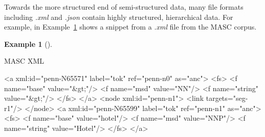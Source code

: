\documentclass[
  letterpaper,
  DIV=11,
  numbers=noendperiod]{scrreport}
\newenvironment{Shaded}{\begin{snugshade}}{\end{snugshade}}
\newcommand{\DecValTok}[1]{\textcolor[rgb]{0.00,0.00,0.00}{#1}}
\newcommand{\KeywordTok}[1]{\textcolor[rgb]{0.00,0.00,0.00}{#1}}
\newcommand{\NormalTok}[1]{\textcolor[rgb]{0.00,0.00,0.00}{#1}}
\newcommand{\OtherTok}[1]{\textcolor[rgb]{0.00,0.00,0.00}{#1}}
\newcommand{\StringTok}[1]{\textcolor[rgb]{0.00,0.00,0.00}{#1}}
\theoremstyle{definition}
\newtheorem{example}{Example}[chapter]
\theoremstyle{remark}
\begin{document}
Towards the more structured end of semi-structured data, many file
formats including \emph{.xml} and \emph{.json} contain highly
structured, hierarchical data. For example, in
Example~\ref{exm-masc-xml} shows a snippet from a \emph{.xml} file from
the MASC corpus.

\begin{example}[]\protect\hypertarget{exm-masc-xml}{}\label{exm-masc-xml}

MASC XML

\begin{Shaded}
\begin{Highlighting}[]
\NormalTok{\textless{}}\KeywordTok{a}\OtherTok{ xml:id=}\StringTok{"penn{-}N65571"}\OtherTok{ label=}\StringTok{"tok"}\OtherTok{ ref=}\StringTok{"penn{-}n0"}\OtherTok{ as=}\StringTok{"anc"}\NormalTok{\textgreater{}                                                                                                                                                        }
\NormalTok{  \textless{}}\KeywordTok{fs}\NormalTok{\textgreater{}}
\NormalTok{    \textless{}}\KeywordTok{f}\OtherTok{ name=}\StringTok{"base"}\OtherTok{ value=}\StringTok{"}\DecValTok{\&gt;}\StringTok{"}\NormalTok{/\textgreater{}}
\NormalTok{    \textless{}}\KeywordTok{f}\OtherTok{ name=}\StringTok{"msd"}\OtherTok{ value=}\StringTok{"NN"}\NormalTok{/\textgreater{}}
\NormalTok{    \textless{}}\KeywordTok{f}\OtherTok{ name=}\StringTok{"string"}\OtherTok{ value=}\StringTok{"}\DecValTok{\&gt;}\StringTok{"}\NormalTok{/\textgreater{}}
\NormalTok{  \textless{}/}\KeywordTok{fs}\NormalTok{\textgreater{}}
\NormalTok{\textless{}/}\KeywordTok{a}\NormalTok{\textgreater{}}
\NormalTok{\textless{}}\KeywordTok{node}\OtherTok{ xml:id=}\StringTok{"penn{-}n1"}\NormalTok{\textgreater{}}
\NormalTok{  \textless{}}\KeywordTok{link}\OtherTok{ targets=}\StringTok{"seg{-}r1"}\NormalTok{/\textgreater{}}
\NormalTok{\textless{}/}\KeywordTok{node}\NormalTok{\textgreater{}}
\NormalTok{\textless{}}\KeywordTok{a}\OtherTok{ xml:id=}\StringTok{"penn{-}N65599"}\OtherTok{ label=}\StringTok{"tok"}\OtherTok{ ref=}\StringTok{"penn{-}n1"}\OtherTok{ as=}\StringTok{"anc"}\NormalTok{\textgreater{}}
\NormalTok{  \textless{}}\KeywordTok{fs}\NormalTok{\textgreater{}}
\NormalTok{    \textless{}}\KeywordTok{f}\OtherTok{ name=}\StringTok{"base"}\OtherTok{ value=}\StringTok{"hotel"}\NormalTok{/\textgreater{}}
\NormalTok{    \textless{}}\KeywordTok{f}\OtherTok{ name=}\StringTok{"msd"}\OtherTok{ value=}\StringTok{"NNP"}\NormalTok{/\textgreater{}}
\NormalTok{    \textless{}}\KeywordTok{f}\OtherTok{ name=}\StringTok{"string"}\OtherTok{ value=}\StringTok{"Hotel"}\NormalTok{/\textgreater{}}
\NormalTok{  \textless{}/}\KeywordTok{fs}\NormalTok{\textgreater{}}
\NormalTok{\textless{}/}\KeywordTok{a}\NormalTok{\textgreater{}}
\end{Highlighting}
\end{Shaded}

\end{example}
\end{document}
